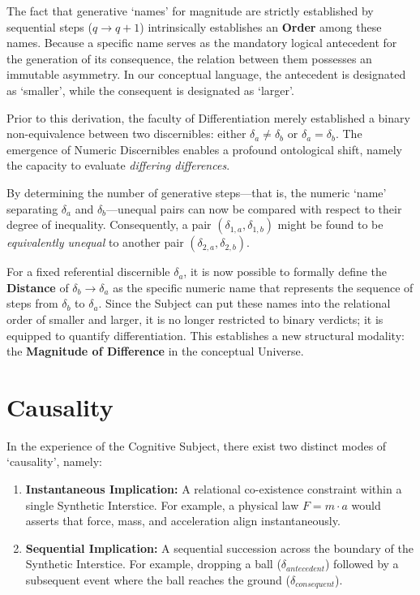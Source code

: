 \documentclass[11pt, a4paper]{article}
\theoremstyle{formalism}
\begin{document}
The fact that generative `names' for magnitude are strictly established by 
sequential steps ($q \to q+1$) intrinsically establishes an \textbf{Order} among 
these names. Because a specific name serves as the mandatory logical antecedent 
for the generation of its consequence, the relation between them possesses an 
immutable asymmetry. In our conceptual language, the antecedent is designated 
as `smaller', while the consequent is designated as `larger'.

Prior to this derivation, the faculty of Differentiation merely established a 
binary non-equivalence between two discernibles: either $\delta_a \neq \delta_b$ 
or $\delta_a = \delta_b$. The emergence of Numeric Discernibles enables a profound 
ontological shift, namely the capacity to evaluate \textit{differing differences}. 

By determining the number of generative steps---that is, the numeric `name' 
separating $\delta_a$ and $\delta_b$---unequal pairs can now be compared with 
respect to their degree of inequality. Consequently, a pair $(\delta_{1,a}, 
\delta_{1,b})$ might be found to be \textit{equivalently unequal} to another pair 
$(\delta_{2,a}, \delta_{2,b})$. 

For a fixed referential discernible $\delta_a$, it is now possible to formally
define the \textbf{Distance} of $\delta_b \to \delta_a$ as the specific numeric
name that represents the sequence of steps from $\delta_b$ to $\delta_a$. Since
the Subject can put these names into the relational order of smaller and
larger, it is no longer restricted to binary verdicts; it is equipped to
quantify differentiation. This establishes a new structural modality: the
\textbf{Magnitude of Difference} in the conceptual Universe.

\section{Causality}

In the experience of the Cognitive Subject, there exist two distinct modes of
`causality', namely:

\begin{enumerate}

    \item \textbf{Instantaneous Implication:} A relational co-existence
    constraint within a single Synthetic Interstice. For example, a physical
    law $F = m \cdot a$ would asserts that force, mass, and acceleration align
    instantaneously. 

    \item \textbf{Sequential Implication:} A sequential succession across the
    boundary of the Synthetic Interstice. For example, dropping a ball
    ($\delta_{antecedent}$) followed by a subsequent event where
    the ball reaches the ground ($\delta_{consequent}$).
    
\end{enumerate}
\end{document}

